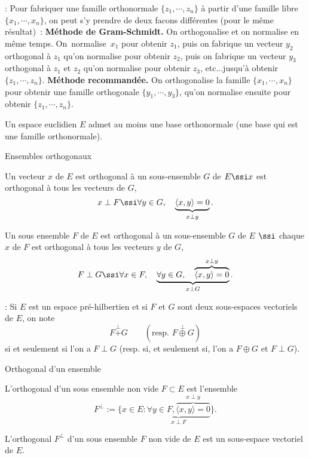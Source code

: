  : Pour fabriquer une famille orthonormale $\{z_1,\cdots,z_n\}$ \`a partir d'une famille libre $\{x_1,\cdots,x_n\}$, 
on peut s'y prendre de deux fa\cced cons diff\'erentes (pour le m\^eme r\'esultat)~:
\medskip
\noindent
{\bf M\'ethode de Gram-Schmidt. } On orthogonalise et on normalise en m\^eme temps. On~normalise~$x_1$ pour obtenir $z_1$, 
puis on fabrique un vecteur $y_2$ orthogonal \`a $z_1$ qu'on normalise pour obtenir $z_2$, 
puis on fabrique un vecteur $y_3$ orthogonal \`a $z_1$ et $z_2$ qu'on normalise pour obtenir $z_3$, etc...jusqu'\`a obtenir $\{z_1,\cdots,z_n\}$. 
\medskip
\noindent
{\bf M\'ethode recommand\'ee. }On orthogonalise la famille $\{x_1,\cdots,x_n\}$ pour obtenir une famille orthogonale $\{y_1,\cdots,y_3\}$, qu'on normalise ensuite pour obtenir $\{z_1,\cdots,z_n\}$. 
\bigskip
{}%


\Propriete Un espace euclidien $E$ admet au moins une base orthonormale (une base qui est une famille orthonormale). 


\Concept Ensembles orthogonaux


Un vecteur $x$ de $E$ est orthogonal \`a un sous-ensemble $G$ de $E\ssi x$ est orthogonal \`a tous les vecteurs de $G$, 
$$
x\perp F \ssi \forall y\in G, \quad \underbrace{\langle x,y\rangle=0}_{x\perp y}. 
$$

Un sous ensemble $F$ de $E$ est orthogonal \`a un sous-ensemble $G$ de $E$ $\ssi$ chaque $x$ de $F$ est orthogonal \`a tous les vecteurs $y$ de $G$, 
$$
F\perp G \ssi \forall x\in F,\quad \underbrace{\forall y\in G, \quad \overbrace{\langle x,y\rangle=0}^{x\perp y}}_{x\perp G}. 
$$

\Remarque : Si $E$ est un espace pr\'e-hilbertien et si $F$ et $G$ sont deux sous-espaces vectoriels de $E$, on note 
$$
F\mathop{+}\limits^\perp G\qquad (\mbox{resp. }F\mathop{\oplus}\limits^\perp G)
$$
si et seulement si l'on a $F\perp G$ (resp. si, et seulement si, l'on a $F\oplus G$ et $F\perp G$). 
\bigskip


\Concept Orthogonal d'un ensemble

L'orthogonal d'un sous ensemble non vide $F\subset E$ est l'ensemble 
$$
F^\perp:=\{x\in E:\underbrace{\forall y\in F, \overbrace{\langle x,y\rangle=0}^{x\perp y}}_{x\perp F}\}.
$$

L'orthogonal $F^\perp$ d'un sous ensemble $F$ non vide de $E$ est un sous-espace vectoriel de $E$. 


